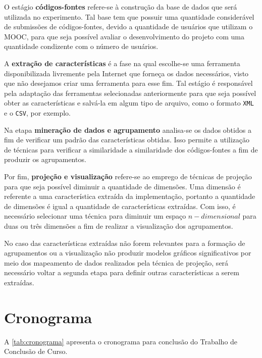 	O estágio \textbf{códigos-fontes} refere-se à construção da base de dados que será
	utilizada no experimento. Tal base tem que possuir uma quantidade considerável de
	submissões de códigos-fontes, devido a quantidade de usuários que utilizam o MOOC,
	para que seja possível avaliar o desenvolvimento do projeto com uma quantidade
	condizente com o número de usuários.
	
	A \textbf{extração de características} é a fase na qual escolhe-se uma ferramenta
	disponibilizada livremente pela Internet que forneça os dados necessários, visto
	que não desejamos criar uma ferramenta para esse fim. Tal estágio é responsável pela
	adaptação das ferramentas selecionadas anteriormente para que seja possível obter
	as características e salvá-la em algum tipo de arquivo, como o formato \texttt{XML}
	e o \texttt{CSV}, por exemplo.

	Na etapa \textbf{mineração de dados e agrupamento} analisa-se os dados obtidos a
	fim de verificar um padrão das características obtidas. Isso permite a utilização
	de técnicas para verificar a similaridade a similaridade dos códigos-fontes a fim
	de produzir os agrupamentos.
	
	Por fim, \textbf{projeção e visualização} refere-se ao emprego de técnicas de
	projeção para que seja possível diminuir a quantidade de dimensões. Uma dimensão
	é referente a uma característica extraída da implementação, portanto a quantidade
	de dimensões é igual a quantidade de características extraídas. Com isso, é
	necessário selecionar uma técnica para diminuir um espaço $n-dimensional$ para
	duas ou três dimensões a fim de realizar a visualização dos agrupamentos.
	
	No caso das características extraídas não forem relevantes para a formação de
	agrupamentos ou a visualização não produzir modelos gráficos significativos por
	meio dos mapeamento de dados realizados pela técnica de projeção, será necessário
	voltar a segunda etapa para definir outras características a serem extraídas.

	\section{Cronograma}
	
	A \cref{tab:cronograma} apresenta o cronograma para conclusão do Trabalho de
	Conclusão de Curso.
	
